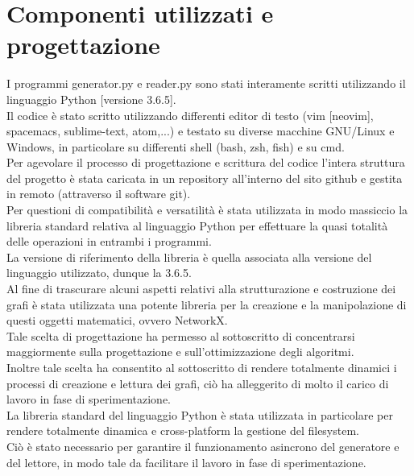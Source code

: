 \section{Componenti utilizzati e progettazione}
\justify
I programmi generator.py e reader.py sono stati interamente scritti utilizzando il linguaggio Python [versione 3.6.5].\\

Il codice è stato scritto utilizzando differenti editor di testo (vim [neovim], spacemacs, sublime-text, atom,...) e testato su diverse macchine GNU/Linux e Windows, in particolare su differenti shell (bash, zsh, fish) e su cmd.\\

Per agevolare il processo di progettazione e scrittura del codice l'intera struttura del progetto è stata caricata in un repository all'interno del sito github e gestita in remoto (attraverso il software git).\\

Per questioni di compatibilità e versatilità è stata utilizzata in modo massiccio la libreria standard relativa al linguaggio Python per effettuare la quasi totalità delle operazioni in entrambi i programmi.\\

La versione di riferimento della libreria è quella associata alla versione del linguaggio utilizzato, dunque la 3.6.5.\\

Al fine di trascurare alcuni aspetti relativi alla strutturazione e costruzione dei grafi è stata utilizzata una potente libreria per la creazione e la manipolazione di questi oggetti matematici, ovvero NetworkX.\\

Tale scelta di progettazione ha permesso al sottoscritto di concentrarsi maggiormente sulla progettazione e sull'ottimizzazione degli algoritmi.\\

Inoltre tale scelta ha consentito al sottoscritto di rendere totalmente dinamici i processi di creazione e lettura dei grafi, ciò ha alleggerito di molto il carico di lavoro in fase di sperimentazione.\\

La libreria standard del linguaggio Python è stata utilizzata in particolare per rendere totalmente dinamica e cross-platform la gestione del filesystem.\\

Ciò è stato necessario per garantire il funzionamento asincrono del generatore e del lettore, in modo tale da facilitare il lavoro in fase di sperimentazione.\\

